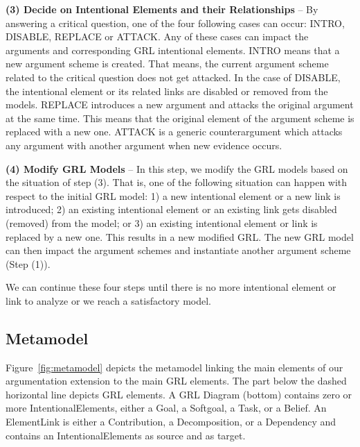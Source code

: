 \textbf{(3) Decide on Intentional Elements and their Relationships} -- By answering a critical question, one of the four following cases can occur: \textsf{INTRO}, \textsf{DISABLE}, \textsf{REPLACE} or \textsf{ATTACK}.  Any of these cases can  impact the arguments and corresponding GRL intentional elements.  \textsf{INTRO} means that 
a new argument scheme is created. That means, the current argument scheme related to the critical question does not get attacked.  In the case of \textsf{DISABLE}, the intentional element or its related links are disabled or removed from the models. \textsf{REPLACE} introduces a new argument and attacks the original argument at the same time. This means that the original element of the argument scheme is replaced with a new one.   \textsf{ATTACK} is a generic counterargument which attacks any argument with another argument when new evidence occurs.  

\textbf{(4) Modify GRL Models} -- In this step, we modify the GRL models based on the situation of step (3). That is, one of the following situation can happen with respect to the initial GRL model: 1) a new intentional element or a new link is introduced; 2) an existing intentional element or an existing link gets disabled (removed) from the model; or 3) an existing intentional element or link is replaced by a new one. This results in a new modified GRL. The new GRL model can then impact the argument schemes and instantiate another argument scheme (Step (1)).   

We can continue these four steps until there is no more intentional element or link to analyze or we reach a satisfactory model. 

\subsection{Metamodel}


Figure~\ref{fig:metamodel} depicts the metamodel linking the main elements of our argumentation extension to the main GRL elements. The part below the dashed horizontal line depicts GRL elements. A \textsf{GRL Diagram} (bottom) contains zero or more \textsf{IntentionalElements}, either a \textsf{Goal}, a \textsf{Softgoal}, a \textsf{Task}, or a \textsf{Belief}. An \textsf{ElementLink} is either a \textsf{Contribution}, a \textsf{Decomposition}, or a \textsf{Dependency} and contains an \textsf{IntentionalElements} as source and as target.

